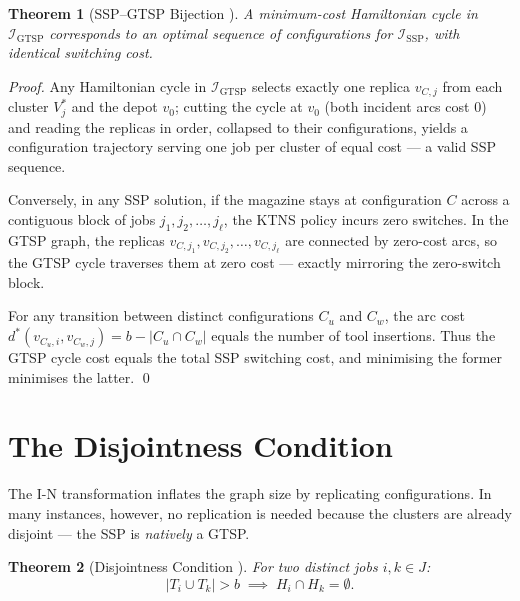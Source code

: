 \documentclass[11pt,a4paper]{article}
\theoremstyle{plain}
\newtheorem{theorem}{Theorem}[section]
\theoremstyle{definition}
\begin{document}
\begin{thmbox}
\begin{theorem}[SSP–GTSP Bijection \cite{Colares2026Exact}]
\label{thm:bijection}
A minimum-cost Hamiltonian cycle in $\mathcal{I}_{\text{GTSP}}$ corresponds to
an optimal sequence of configurations for $\mathcal{I}_{\text{SSP}}$, with
identical switching cost.
\end{theorem}
\end{thmbox}

\begin{proofbox}
\begin{proof}
Any Hamiltonian cycle in $\mathcal{I}_{\text{GTSP}}$ selects exactly one replica
$v_{C,j}$ from each cluster $V_j^*$ and the depot $v_0$; cutting the cycle at
$v_0$ (both incident arcs cost $0$) and reading the replicas in order, collapsed
to their configurations, yields a configuration trajectory serving one job per
cluster of equal cost — a valid SSP sequence.

Conversely, in any SSP solution, if the magazine stays at configuration $C$ across
a contiguous block of jobs $j_1, j_2, \ldots, j_\ell$, the KTNS policy incurs zero
switches. In the GTSP graph, the replicas $v_{C,j_1}, v_{C,j_2}, \ldots, v_{C,j_\ell}$
are connected by zero-cost arcs, so the GTSP cycle traverses them at zero cost —
exactly mirroring the zero-switch block.

For any transition between distinct configurations $C_u$ and $C_w$, the arc cost
$d^*(v_{C_u,i}, v_{C_w,j}) = b - |C_u \cap C_w|$ equals the number of tool
insertions. Thus the GTSP cycle cost equals the total SSP switching cost, and
minimising the former minimises the latter. \qed
\end{proof}
\end{proofbox}

\section{The Disjointness Condition}
\label{sec:disjointness}

The I-N transformation inflates the graph size by replicating configurations.
In many instances, however, no replication is needed because the clusters are
already disjoint — the SSP is \emph{natively} a GTSP.

\begin{thmbox}
\begin{theorem}[Disjointness Condition \cite{Colares2026Exact}]
\label{thm:disjoint}
For two distinct jobs $i, k \in J$:
\[
  |T_i \cup T_k| > b \;\implies\; H_i \cap H_k = \emptyset.
\]
\end{theorem}
\end{thmbox}
\end{document}
